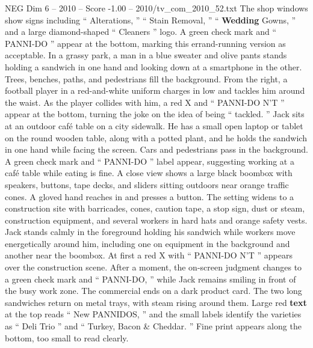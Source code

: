 \begin{textsample}{NEG Dim 6 – 2010 – Score -1.00 – 2010/tv\_com\_2010\_52.txt}
The shop windows show signs including “ Alterations, ” “ Stain Removal, ” “ \textbf{Wedding} Gowns, ” and a large diamond-shaped “ Cleaners ” logo.
A green check mark and “ PANNI-DO ” appear at the bottom, marking this errand-running version as acceptable.
In a grassy park, a man in a blue sweater and olive pants stands holding a sandwich in one hand and looking down at a smartphone in the other.
Trees, benches, paths, and pedestrians fill the background.
From the right, a football player in a red-and-white uniform charges in low and tackles him around the waist.
As the player collides with him, a red X and “ PANNI-DO N’T ” appear at the bottom, turning the joke on the idea of being “ tackled. ” Jack sits at an outdoor café table on a city sidewalk.
He has a small open laptop or tablet on the round wooden table, along with a potted plant, and he holds the sandwich in one hand while facing the screen.
Cars and pedestrians pass in the background.
A green check mark and “ PANNI-DO ” label appear, suggesting working at a café table while eating is fine.
A close view shows a large black boombox with speakers, buttons, tape decks, and sliders sitting outdoors near orange traffic cones.
A gloved hand reaches in and presses a button.
The setting widens to a construction site with barricades, cones, caution tape, a stop sign, dust or steam, construction equipment, and several workers in hard hats and orange safety vests.
Jack stands calmly in the foreground holding his sandwich while workers move energetically around him, including one on equipment in the background and another near the boombox.
At first a red X with “ PANNI-DO N’T ” appears over the construction scene.
After a moment, the on-screen judgment changes to a green check mark and “ PANNI-DO, ” while Jack remains smiling in front of the busy work zone.
The commercial ends on a dark product card.
The two long sandwiches return on metal trays, with steam rising around them.
Large red \textbf{text} at the top reads “ New PANNIDOS, ” and the small labels identify the varieties as “ Deli Trio ” and “ Turkey, Bacon \& Cheddar. ” Fine print appears along the bottom, too small to read clearly.

\end{textsample}

